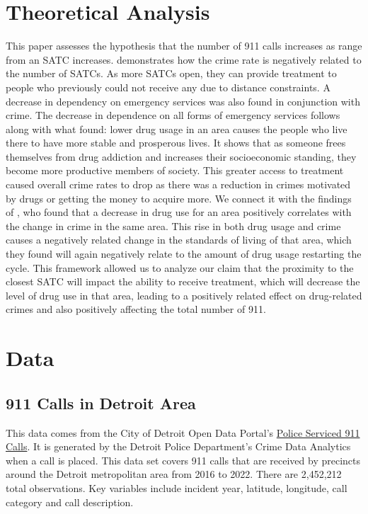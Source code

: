 \documentclass[12pt]{article}
\begin{document}
\section{Theoretical Analysis}
\label{sec:theory}
This paper assesses the hypothesis that the number of 911 calls increases as range from an SATC increases. \cite{SAT_centers_and_crime} demonstrates how the crime rate is negatively related to the number of SATCs. As more SATCs open, they can provide treatment to people who previously could not receive any due to distance constraints. A decrease in dependency on emergency services was also found in conjunction with crime. The decrease in dependence on all forms of emergency services follows along with what \cite{Socioeconomic-Determinants} found: lower drug usage in an area causes the people who live there to have more stable and prosperous lives. It shows that as someone frees themselves from drug addiction and increases their socioeconomic standing, they become more productive members of society. This greater access to treatment caused overall crime rates to drop as there was a reduction in crimes motivated by drugs or getting the money to acquire more. We connect it with the findings of \cite{drugs_and_crime}, who found that a decrease in drug use for an area positively correlates with the change in crime in the same area. This rise in both drug usage and crime causes a negatively related change in the standards of living of that area, which they found will again negatively relate to the amount of drug usage restarting the cycle. This framework allowed us to analyze our claim that the proximity to the closest SATC will impact the ability to receive treatment, which will decrease the level of drug use in that area, leading to a positively related effect on drug-related crimes and also positively affecting the total number of 911.



\section{Data}
\label{sec:data}

\subsection{911 Calls in Detroit Area}

This data comes from the City of Detroit Open Data Portal's   \href{https://data.detroitmi.gov/datasets/detroitmi::police-serviced-911-calls/about}{Police Serviced 911 Calls}. It is generated by the Detroit Police Department's Crime Data Analytics when a call is placed. This data set covers 911 calls that are received by precincts around the Detroit metropolitan area from 2016 to 2022. There are 2,452,212 total observations. Key variables include incident year, latitude, longitude, call category and call description. 
\end{document}
